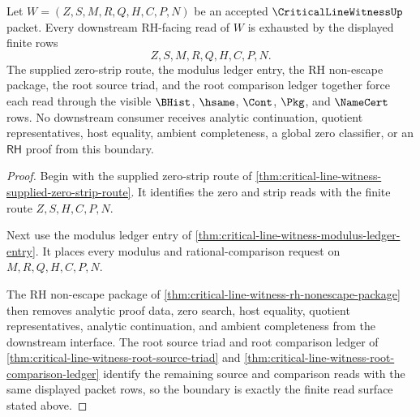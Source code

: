 \begin{theorem}
\label{thm:critical-line-witness-downstream-rh-boundary-refinement}
Let $W=(Z,S,M,R,Q,H,C,P,N)$ be an accepted $\CriticalLineWitnessUp$ packet. Every downstream RH-facing read of $W$ is exhausted by the displayed finite rows
$$
Z,S,M,R,Q,H,C,P,N.
$$
The supplied zero-strip route, the modulus ledger entry, the RH non-escape package, the root source triad, and the root comparison ledger together force each read through the visible $\BHist$, $\hsame$, $\Cont$, $\Pkg$, and $\NameCert$ rows. No downstream consumer receives analytic continuation, quotient representatives, host equality, ambient completeness, a global zero classifier, or an $\mathsf{RH}$ proof from this boundary.
\end{theorem}
\begin{proof}
Begin with the supplied zero-strip route of \autoref{thm:critical-line-witness-supplied-zero-strip-route}. It identifies the zero and strip reads with the finite route $Z,S,H,C,P,N$.

Next use the modulus ledger entry of \autoref{thm:critical-line-witness-modulus-ledger-entry}. It places every modulus and rational-comparison request on $M,R,Q,H,C,P,N$.

The RH non-escape package of \autoref{thm:critical-line-witness-rh-nonescape-package} then removes analytic proof data, zero search, host equality, quotient representatives, analytic continuation, and ambient completeness from the downstream interface. The root source triad and root comparison ledger of \autoref{thm:critical-line-witness-root-source-triad} and \autoref{thm:critical-line-witness-root-comparison-ledger} identify the remaining source and comparison reads with the same displayed packet rows, so the boundary is exactly the finite read surface stated above.
\end{proof}

